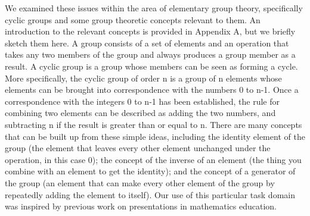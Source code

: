 \documentclass[man,10pt]{apa6}
\begin{document}
We examined these issues within the area of elementary group theory, specifically cyclic groups and some group theoretic concepts relevant to them. An introduction to the relevant concepts is provided in Appendix A, but we briefly sketch them here. A group consists of a set of elements and an operation that takes any two members of the group and always produces a group member as a result. A cyclic group is a group whose members can be seen as forming a cycle. More specifically, the cyclic group of order n is a group of n elements whose elements can be brought into correspondence with the numbers 0 to n-1. Once a correspondence with the integers 0 to n-1 has been established, the rule for combining two elements can be described as adding the two numbers, and subtracting n if the result is greater than or equal to n. There are many concepts that can be built up from these simple ideas, including the identity element of the group (the element that leaves every other element unchanged under the operation, in this case 0); the concept of the inverse of an element (the thing you combine with an element to get the identity); and the concept of a generator of the group (an element that can make every other element of the group by repeatedly adding the element to itself). Our use of this particular task domain was inspired by previous work on presentations in mathematics education. 
\end{document}

